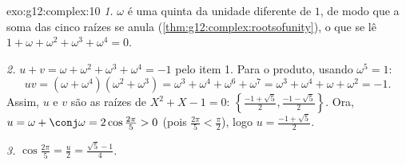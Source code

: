 \begin{solution}{exo:g12:complex:10}
\emph{1.} $\omega$ é uma  quinta da unidade diferente de $1$, de modo
que a soma das cinco raízes se anula
(\cref{thm:g12:complex:rootsofunity}), o que se lê
$1 + \omega + \omega^2 + \omega^3 + \omega^4 = 0$.

\emph{2.} $u + v = \omega + \omega^2 + \omega^3 + \omega^4 = -1$ pelo item
1. Para o produto, usando $\omega^5 = 1$:
\[
uv = (\omega + \omega^4)(\omega^2 + \omega^3)
= \omega^3 + \omega^4 + \omega^6 + \omega^7
= \omega^3 + \omega^4 + \omega + \omega^2 = -1 .
\]
Assim, $u$ e $v$ são as raízes de $X^2 + X - 1 = 0$:
$\left\{\frac{-1+\sqrt5}{2}, \frac{-1-\sqrt5}{2}\right\}$. Ora,
$u = \omega + \conj\omega = 2\cos\frac{2\pi}{5} > 0$ (pois
$\frac{2\pi}{5} < \frac{\pi}{2}$), logo $u = \frac{-1 + \sqrt5}{2}$.

\emph{3.} $\cos\frac{2\pi}{5} = \frac u2 = \frac{\sqrt5 - 1}{4}$.
\end{solution}

